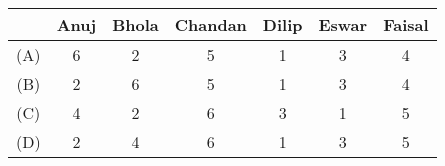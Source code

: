     \begin{tabular}{|c|c|c|c|c|c|c|}
    \hline
    & Anuj & Bhola & Chandan & Dilip & Eswar & Faisal \\ \hline
    (A) & 6 & 2 & 5 & 1 & 3 & 4 \\ \hline
    (B) & 2 & 6 & 5 & 1 & 3 & 4 \\ \hline
    (C) & 4 & 2 & 6 & 3 & 1 & 5 \\ \hline
    (D) & 2 & 4 & 6 & 1 & 3 & 5 \\ \hline
    \end{tabular}